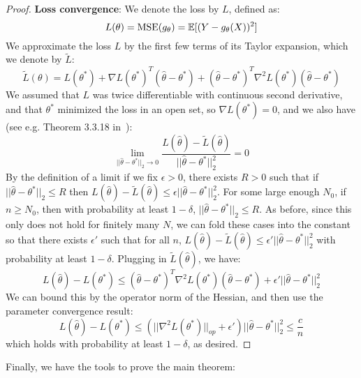 \begin{proof}
\textbf{Loss convergence}: We denote the loss by $L$, defined as:
\[ L(\theta) = \mbox{MSE}(g_{\theta}) = \mathbb{E}[ (Y - g_{\theta}(X))^2 ] \]
We approximate the loss $L$ by the first few terms of its Taylor expansion, which we denote by $\widetilde{L}$:
\[ \widetilde{L}(\theta) = L(\theta^*) + \nabla L(\theta^*)^T (\hat{\theta} - \theta^*) + (\hat{\theta} - \theta^*)^T \nabla^2 L(\theta^*) (\hat{\theta} - \theta^*) \]
We assumed that $L$ was twice differentiable with continuous second derivative, and that $\theta^*$ minimized the loss in an open set, so $\nabla L(\theta^*) = 0$, and we also have (see e.g. Theorem 3.3.18 in~\cite{hubbard1998vector}):
\[ \lim_{||\hat{\theta} - \theta^*||_2 \to 0} \frac{L(\hat{\theta}) - \widetilde{L}(\hat{\theta})}{||\hat{\theta} - \theta^*||_2^2} = 0 \]
By the definition of a limit if we fix $\epsilon > 0$, there exists $R > 0$ such that if $||\hat{\theta} - \theta^*||_2 \leq R$ then $L(\hat{\theta}) - \widetilde{L}(\hat{\theta}) \leq \epsilon ||\hat{\theta} - \theta^*||_2^2$. For some large enough $N_0$, if $n \geq N_0$, then with probability at least $1 - \delta$, $||\hat{\theta} - \theta^*||_2 \leq R$. As before, since this only does not hold for finitely many $N$, we can fold these cases into the constant so that there exists $\epsilon'$ such that for all $n$, $L(\hat{\theta}) - \widetilde{L}(\hat{\theta}) \leq \epsilon' ||\hat{\theta} - \theta^*||_2^2$ with probability at least $1 - \delta$. Plugging in $\widetilde{L}(\hat{\theta})$, we have:
\[ L(\hat{\theta}) - L(\theta^*) \leq (\hat{\theta} - \theta^*)^T \nabla^2 L(\theta^*) (\hat{\theta} - \theta^*) + \epsilon' ||\hat{\theta} - \theta^*||_2^2 \]
We can bound this by the operator norm of the Hessian, and then use the parameter convergence result:
\[ L(\hat{\theta}) - L(\theta^*) \leq (|| \nabla^2 L(\theta^*) ||_{op} + \epsilon') ||\hat{\theta} - \theta^*||_2^2 \leq \frac{c}{n} \]
which holds with probability at least $1 - \delta$, as desired.

\end{proof}

Finally, we have the tools to prove the main theorem:

